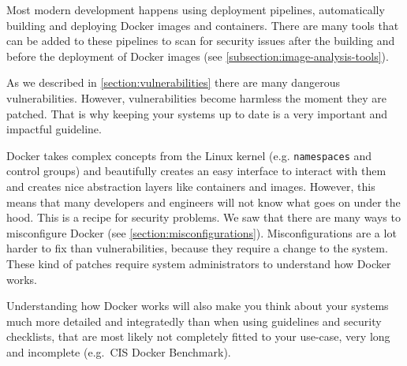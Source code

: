 \hfill

Most modern development happens using deployment pipelines, automatically building and deploying Docker images and containers. There are many tools that can be added to these pipelines to scan for security issues after the building and before the deployment of Docker images (see \autoref{subsection:image-analysis-tools}).

\hfill

As we described in \autoref{section:vulnerabilities} there are many dangerous vulnerabilities. However, vulnerabilities become harmless the moment they are patched. That is why keeping your systems up to date is a very important and impactful guideline.

\hfill

Docker takes complex concepts from the Linux kernel (e.g. \lstinline{namespaces} and control groups) and beautifully creates an easy interface to interact with them and creates nice abstraction layers like containers and images. However, this means that many developers and engineers will not know what goes on under the hood. This is a recipe for security problems. We saw that there are many ways to misconfigure Docker (see \autoref{section:misconfigurations}). Misconfigurations are a lot harder to fix than vulnerabilities, because they require a change to the system. These kind of patches require system administrators to understand how Docker works.


Understanding how Docker works will also make you think about your systems much more detailed and integratedly than when using guidelines and security checklists, that are most likely not completely fitted to your use-case, very long and incomplete (e.g.\ CIS Docker Benchmark).
